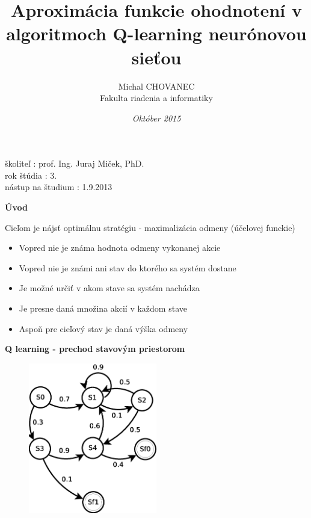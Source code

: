 \documentclass[xcolor=dvipsnames]{beamer}
\title{\bf Aproximácia funkcie ohodnotení v algoritmoch Q-learning neurónovou sieťou}
\author{Michal CHOVANEC \\Fakulta riadenia a informatiky}
\date[EURP]{\it Október 2015}
\begin{document}
\begin{frame}
\titlepage
školiteľ : prof. Ing. Juraj Miček, PhD. \\
rok štúdia : 3. \\
nástup na študium : 1.9.2013 \\
\end{frame}

\begin{frame}{\bf Úvod}

Cieľom je nájsť optimálnu stratégiu - maximalizácia odmeny (účelovej funckie)

\begin{itemize}
\item{Vopred nie je známa hodnota odmeny vykonanej akcie}
\item{Vopred nie je známi ani stav do ktorého sa systém dostane}
\item{Je možné určiť v akom stave sa systém nachádza}
\item{Je presne daná množina akcií v každom stave}
\item{Aspoň pre cieľový stav je daná výška odmeny}
\end{itemize}

\end{frame}

\begin{frame}{\bf Q learning - prechod stavovým priestorom}


\begin{figure}[ht]
\begin{center}
\includegraphics[width=0.5\textwidth]{diagrams/markov_decision.eps}
\end{center}
\end{figure}

\end{frame}
\end{document}
